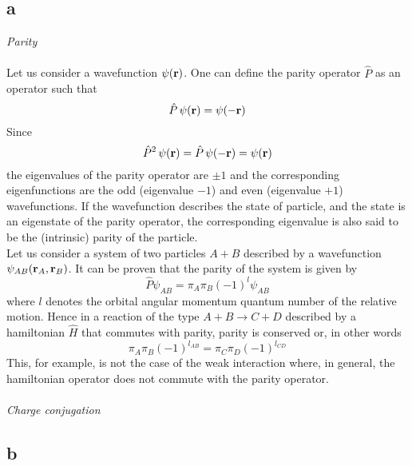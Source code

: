 \subsection*{a} 
\vspace{10pt}
\emph{Parity} \\
\vspace{10pt} \\
Let us consider a wavefunction $\psi(\mathbf{r})$. One can define the parity operator $\hat P$ as an operator such that 
\begin{equation*}
    \hat P \, \psi(\mathbf{r}) = \psi(-\mathbf{r})
\end{equation*}
Since
\begin{equation}
    \hat P^2 \, \psi(\mathbf{r}) = \hat P \, \psi(-\mathbf{r}) = \psi(\mathbf{r})
    \label{eq:eigenvalue_equation_parity}
\end{equation}
the eigenvalues of the parity operator are $\pm 1$ and the corresponding eigenfunctions are the odd (eigenvalue $-1$) and even (eigenvalue $+1$) wavefunctions. If the wavefunction
describes the state of particle, and the state is an eigenstate of the parity operator, the corresponding eigenvalue is also said to be the (intrinsic) parity of the particle. \\
Let us consider a system of two particles $A+B$ described by a wavefunction $\psi_{AB}(\mathbf{r}_A, \mathbf{r}_B)$. It can be proven that the parity of the system is given by 
\begin{equation*}
    \hat P \psi_{AB} = \pi_A \pi_B (-1)^l \psi_{AB}
\end{equation*}
where $l$ denotes the orbital angular momentum quantum number of the relative motion. Hence in a reaction of the type $A+B \rightarrow C+D$ described by a hamiltonian $\hat H$ that commutes with parity,
parity is conserved or, in other words
\begin{equation*}
    \pi_A \pi_B (-1)^{l_{AB}} = \pi_C \pi_D (-1)^{l_{CD}} 
\end{equation*}
This, for example, is not the case of the weak interaction where, in general, the hamiltonian operator does not commute with the parity operator. \\
\vspace{10pt} \\
\emph{Charge conjugation} 
\vspace{10pt} 

\subsection*{b}

